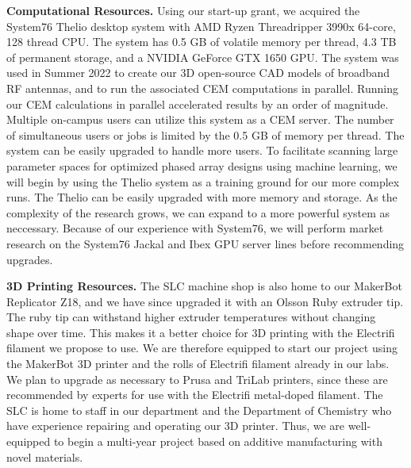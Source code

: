 \documentclass[../../main.tex]{subfiles}
\begin{document}
\textbf{Computational Resources.} Using our start-up grant, we acquired the System76 Thelio desktop system with AMD Ryzen Threadripper 3990x 64-core, 128 thread CPU.  The system has 0.5 GB of volatile memory per thread, 4.3 TB of permanent storage, and a NVIDIA GeForce GTX 1650 GPU.  The system was used in Summer 2022 to create our 3D open-source CAD models of broadband RF antennas, and to run the associated CEM computations in parallel.  Running our CEM calculations in parallel accelerated results by an order of magnitude.  Multiple on-campus users can utilize this system as a CEM server.  The number of simultaneous users or jobs is limited by the 0.5 GB of memory per thread.  The system can be easily upgraded to handle more users.  To facilitate scanning large parameter spaces for optimized phased array designs using machine learning, we will begin by using the Thelio system as a training ground for our more complex runs.  The Thelio can be easily upgraded with more memory and storage.  As the complexity of the research grows, we can expand to a more powerful system as neccessary.  Because of our experience with System76, we will perform market research on the System76 Jackal and Ibex GPU server lines before recommending upgrades.  \\ \vspace{2.5mm}

\textbf{3D Printing Resources.}  The SLC machine shop is also home to our MakerBot Replicator Z18, and we have since upgraded it with an Olsson Ruby extruder tip.  The ruby tip can withstand higher extruder temperatures without changing shape over time.  This makes it a better choice for 3D printing with the Electrifi filament we propose to use.  We are therefore equipped to start our project using the MakerBot 3D printer and the rolls of Electrifi filament already in our labs.  We plan to upgrade as necessary to Prusa and TriLab printers, since these are recommended by experts for use with the Electrifi metal-doped filament.  The SLC is home to staff in our department and the Department of Chemistry who have experience repairing and operating our 3D printer.  Thus, we are well-equipped to begin a multi-year project based on additive manufacturing with novel materials. \\ \vspace{2.5mm}
\end{document}
